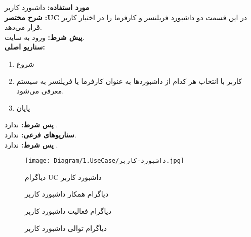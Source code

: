 \textbf{مورد استفاده:}
داشبورد کاربر
\\
\textbf{شرح مختصر :UC}
در این قسمت دو داشبورد فریلنسر و کارفرما را در اختیار کاربر قرار می‌دهد.
\\
\textbf{پيش شرط:}
ورود به سایت.
\\
\textbf{سناريو اصلی:}
\begin{enumerate}
\item
شروع
\item
کاربر با انتخاب هر کدام از داشبوردها به عنوان کارفرما یا فریلنسر به سیستم معرفی می‌شود.
\item
پایان
\end{enumerate}

\noindent
\textbf{پس شرط:}
ندارد .
\\
\textbf{سناريوهای فرعی:}
ندارد.
\\
\textbf{پس شرط:}
ندارد .


\begin{figure}[H]
	\centering
	\texttt{[image: Diagram/1.UseCase/داشبورد-کاربر.jpg]}
	\caption{دیاگرام UC داشبورد کاربر‌}
	\label{fig:uc:داشبورد-کاربر}
\end{figure}
\begin{figure}[H]
\centering
\caption{دیاگرام همکار داشبورد کاربر}
\label{fig:c:داشبورد-کاربر}
\end{figure}
\begin{figure}[H]
	\centering
	\caption{دیاگرام فعالیت ‌داشبورد کاربر}
	\label{fig:a:داشبورد-کاربر}
\end{figure}
\begin{figure}[H]
	\caption{دیاگرام توالی ‌داشبورد کاربر}
	\centering
	\label{fig:s:داشبورد-کاربر}
\end{figure}

